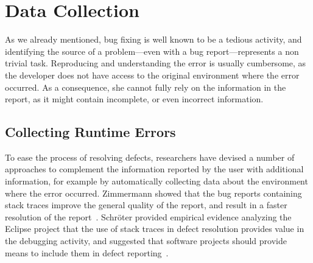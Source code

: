 



\section{Data Collection}\label{sec:related-stacktraces}

As we already mentioned, bug fixing is well known to be a tedious activity, and identifying the source of a problem---even with a bug report---represents a non trivial task.
Reproducing and understanding the error is usually cumbersome, as the developer does not have access to the original environment where the error occurred.
As a consequence, she cannot fully rely on the information in the report, as it might contain incomplete, or even incorrect information.


\subsection{Collecting Runtime Errors}
To ease the process of resolving defects, researchers have devised a number of approaches to complement the information reported by the user with additional information, for example by automatically collecting data about the environment where the error occurred.
Zimmermann \etal showed that the bug reports containing stack traces improve the general quality of the report, and result in a faster resolution of the report~\cite{Zimm2010a}.
Schr\"oter \etal provided empirical evidence analyzing the Eclipse project that the use of stack traces in defect resolution provides value in the debugging activity, and suggested that software projects should provide means to include them in defect reporting~\cite{Schr2010a}.

